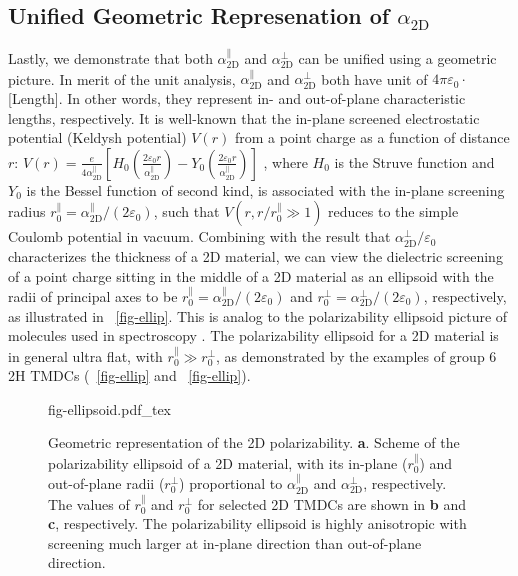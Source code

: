 \subsection{Unified Geometric Represenation of $\alpha_{\mathrm{2D}}$}
\label{sec:diel-unif-geom-repr}

%
Lastly, we demonstrate that both $\alpha_{\mathrm{2D}}^{\parallel}$
and $\alpha_{\mathrm{2D}}^{\perp}$ can be unified using a geometric
picture. In merit of the unit analysis,
$\alpha_{\mathrm{2D}}^{\parallel}$ and $\alpha_{\mathrm{2D}}^{\perp}$
both have unit of $4\pi\varepsilon_{0} \cdot$[Length]. In other words,
they represent in- and out-of-plane characteristic lengths,
respectively. It is well-known that the in-plane screened
electrostatic potential (Keldysh potential) $V(r)$ from a point charge
as a function of distance $r$:
$V(r) = {\displaystyle \frac{e}{4 \alpha_{\mathrm{2D}}^{\parallel}}}
\left[H_{0}({\displaystyle \frac{2\varepsilon_{0}
      r}{\alpha_{\mathrm{2D}}^{\parallel}}}) - Y_{0}( {\displaystyle
    \frac{2
      \varepsilon_{0}r}{\alpha_{\mathrm{2D}}^{\parallel}}})\right]$
\autocite{Keldysh_1979_eps_multi,Pulci_2014_exciton}, where $H_{0}$ is the Struve
function and $Y_{0}$ is the Bessel function of second kind, is
associated with the in-plane screening radius
$r_{0}^{\parallel}=\alpha_{\mathrm{2D}}^{\parallel}/(2
\varepsilon_{0})$, such that $V(r,r/r^{\parallel}_{0} \gg 1)$ reduces
to the simple Coulomb potential in vacuum. Combining with the result
that $\alpha_{\mathrm{2D}}^{\perp}/\varepsilon_{0}$ characterizes the
thickness of a 2D material, we can view the dielectric screening of a
point charge sitting in the middle of a 2D material as an ellipsoid
with the radii of principal axes to be
$r_{0}^{\parallel} = \alpha_{\mathrm{2D}}^{\parallel}/(2
\varepsilon_{0})$ and
$r_{0}^{\perp} = \alpha^{\perp}_{\mathrm{2D}}/(2 \varepsilon_{0})$,
respectively, as illustrated in ~\autoref{fig-ellip}.
This is analog to the polarizability ellipsoid picture of molecules
used in spectroscopy \autocite{Banwell_1994_spectro_book}. The polarizability ellipsoid
for a 2D material is in general ultra flat, with
$r_{0}^{\parallel} \gg r_{0}^{\perp}$, as demonstrated by the examples
of group 6 2H TMDCs (~\autoref{fig-ellip} and
~\autoref{fig-ellip}).
%
\begin{figure}[!htbp]
  \centering
  {fig-ellipsoid.pdf_tex}
  \caption{\label{fig-ellip} Geometric representation of the
      2D polarizability. \textbf{a}. Scheme of the polarizability
    ellipsoid of a 2D material, with its in-plane
    ($r_{0}^{\parallel}$) and out-of-plane radii
    ($r_{\mathrm{0}}^{\perp}$) proportional to
    $\alpha_{\mathrm{2D}}^{\parallel}$ and
    $\alpha_{\mathrm{2D}}^{\perp}$, respectively.  The values of
    $r_{0}^{\parallel}$ and $r_{0}^{\perp}$ for selected 2D TMDCs are
    shown in \textbf{b} and \textbf{c}, respectively.  The
    polarizability ellipsoid is highly anisotropic with screening much
    larger at in-plane direction than out-of-plane direction.}
\end{figure}

